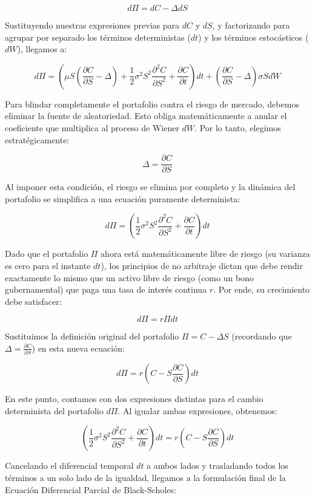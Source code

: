 \documentclass[12pt, a4paper]{article}
\begin{document}
\[ d\Pi = dC - \Delta dS \]

Sustituyendo nuestras expresiones previas para $dC$ y $dS$, y factorizando para agrupar por separado los términos deterministas ($dt$) y los términos estocásticos ($dW$), llegamos a:

\[ d\Pi = \left( \mu S \left( \frac{\partial C}{\partial S} - \Delta \right) + \frac{1}{2} \sigma^2 S^2 \frac{\partial^2 C}{\partial S^2} + \frac{\partial C}{\partial t} \right) dt + \left( \frac{\partial C}{\partial S} - \Delta \right) \sigma S dW \]

Para blindar completamente el portafolio contra el riesgo de mercado, debemos eliminar la fuente de aleatoriedad. Esto obliga matemáticamente a anular el coeficiente que multiplica al proceso de Wiener $dW$. Por lo tanto, elegimos estratégicamente:

\[ \Delta = \frac{\partial C}{\partial S} \]

Al imponer esta condición, el riesgo se elimina por completo y la dinámica del portafolio se simplifica a una ecuación puramente determinista:

\[ d\Pi = \left( \frac{1}{2} \sigma^2 S^2 \frac{\partial^2 C}{\partial S^2} + \frac{\partial C}{\partial t} \right) dt \]

Dado que el portafolio $\Pi$ ahora está matemáticamente libre de riesgo (su varianza es cero para el instante $dt$), los principios de no arbitraje dictan que debe rendir exactamente lo mismo que un activo libre de riesgo (como un bono gubernamental) que paga una tasa de interés continua $r$. Por ende, su crecimiento debe satisfacer:

\[ d\Pi = r\Pi dt \]

Sustituimos la definición original del portafolio $\Pi = C - \Delta S$ (recordando que $\Delta = \frac{\partial C}{\partial S}$) en esta nueva ecuación:

\[ d\Pi = r \left( C - S \frac{\partial C}{\partial S} \right) dt \]

En este punto, contamos con dos expresiones distintas para el cambio determinista del portafolio $d\Pi$. Al igualar ambas expresiones, obtenemos:

\[ \left( \frac{1}{2} \sigma^2 S^2 \frac{\partial^2 C}{\partial S^2} + \frac{\partial C}{\partial t} \right) dt = r \left( C - S \frac{\partial C}{\partial S} \right) dt \]

Cancelando el diferencial temporal $dt$ a ambos lados y trasladando todos los términos a un solo lado de la igualdad, llegamos a la formulación final de la Ecuación Diferencial Parcial de Black-Scholes:
\end{document}
